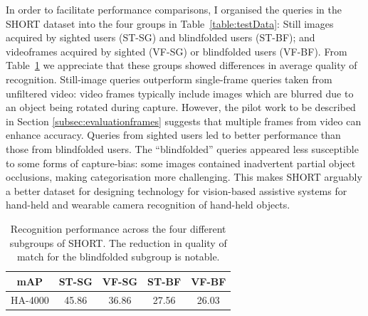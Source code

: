 In order to facilitate performance comparisons, I organised the queries in the SHORT dataset into the four groups in Table~\ref{table:testData}: Still images acquired by sighted users (ST-SG) and blindfolded users (ST-BF); and videoframes acquired by sighted (VF-SG) or blindfolded users (VF-BF). From Table~\ref{table:sightedVSblindfolded} we appreciate that these groups showed differences in average quality of recognition. Still-image queries outperform single-frame queries taken from unfiltered video: video frames typically include images which are blurred due to an object being rotated during capture. However, the pilot work to be described in Section \ref{subsec:evaluationframes} suggests that multiple frames from video can enhance accuracy. Queries from sighted users led to better performance than those from blindfolded users. The ``blindfolded'' queries appeared less susceptible to some forms of  capture-bias: some images contained inadvertent partial object occlusions, making categorisation more challenging. This makes SHORT arguably a better dataset for designing technology for vision-based assistive systems for hand-held and wearable camera recognition of hand-held objects.


\begin{table}[h]
\centering
  \begin{tabular}{ccccc}
   \toprule
    mAP & ST-SG & VF-SG & ST-BF & VF-BF \\
	\midrule
    HA-4000                    & 45.86    & 36.86   & 27.56 & 26.03\\
	\bottomrule
    \end{tabular}
    \caption{Recognition performance across the four different subgroups of SHORT. The reduction in quality of match for the blindfolded subgroup is notable.}
    \label{table:sightedVSblindfolded}
\end{table}


